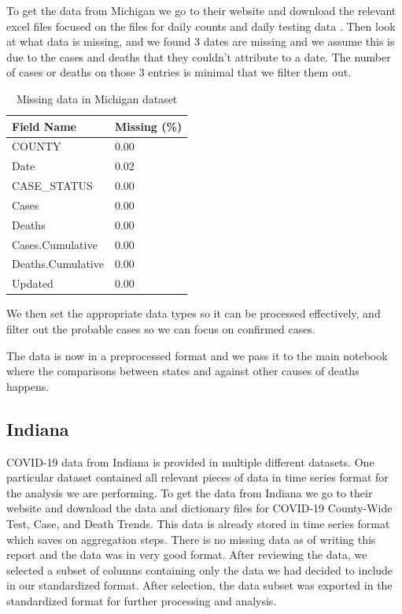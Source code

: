 \documentclass[conference]{IEEEtran}
\begin{document}
To get the data from Michigan we go to their website and download the relevant excel files focused on the files for daily counts and daily testing data \cite{noauthor_coronavirus_nodate}.
Then look at what data is missing, and we found 3 dates are missing and we assume this is due to the cases and deaths that they couldn't attribute to a date. 
The number of cases or deaths on those 3 entries is minimal that we filter them out.
\begin{table}
  \centering
\begin{tabular}{ll}
  \toprule
  Field Name & Missing (\%) \\
  \midrule
  COUNTY            &  0.00 \\
  Date              &  0.02 \\
  CASE\_STATUS       &  0.00 \\
  Cases             &  0.00 \\
  Deaths            &  0.00 \\
  Cases.Cumulative  &  0.00 \\
  Deaths.Cumulative &  0.00 \\
  Updated           &  0.00 \\
  \bottomrule
  \end{tabular}
  \caption{Missing data in Michigan dataset}
  \label{tab:Michigan:missing}
\end{table}

We then set the appropriate data types so it can be processed effectively, and filter out the probable cases so we can focus on confirmed cases.

The data is now in a preprocessed format and we pass it to the main notebook where the comparisons between states and against other causes of deaths happens.


\subsection{Indiana}

COVID-19 data from Indiana is provided in multiple different datasets. 
One particular dataset contained all relevant pieces of data in time series format for the analysis we are performing.
To get the data from Indiana we go to their website and download the data and dictionary files for COVID-19 County-Wide Test, Case, and Death Trends.
This data is already stored in time series format which saves on aggregation steps.
There is no missing data as of writing this report and the data was in very good format. After reviewing the data, we selected a subset of columns containing only the data we had decided to include in our standardized format. After selection, the data subset was exported in the standardized format for further processing and analysis.
\end{document}
